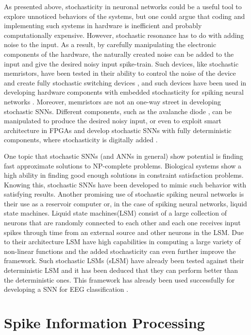 \documentclass[12pt]{report}
\begin{document}
As presented above, stochasticity in neuronal networks could be a useful tool to explore unnoticed behaviors of the systems, but one could argue that coding and implementing such systems in hardware is inefficient and probably computationally expensive. However, stochastic resonance has to do with adding noise to the input. As a result, by carefully manipulating the electronic components of the hardware, the naturally created noise can be added to the input and give the desired noisy input spike-train. Such devices, like stochastic memristors, have been tested in their ability to control the noise of the device and create fully stochastic switching devices \cite{Gaba2013}, and such devices have been used in developing hardware components with embedded stochasticity for spiking neural networks \cite{Maruan2015}. Moreover, memristors are not an one-way street in developing stochastic SNNs. Different components, such as the avalanche diode \cite{Clayton2011}, can be manipulated to produce the desired noisy input, or even to exploit smart architecture in FPGAs and develop stochastic SNNs with fully deterministic components, where stochasticity is digitally added \cite{Josep2012}. 

One topic that stochastic SNNs (and ANNs in general) show potential is finding fast approximate solutions to NP-complete problems. Biological systems show a high ability in finding good enough solutions in constraint satisfaction problems. Knowing this, stochastic SNNs have been developed to mimic such behavior with satisfying results\cite{Fonseca2017}. Another promising use of stochastic spiking neural networks is their use as a reservoir computer or, in the case of spiking neural networks, liquid state machines. Liquid state machines(LSM) consist of a large collection of neurons that are randomly connected to each other and each one receives input spikes through time from an external source and other neurons in the LSM. Due to their architecture LSM have high capabilities in computing a large variety of non-linear functions and the added stochasticity can even further improve the framework. Such stochastic LSMs (sLSM) have already been tested against their deterministic LSM \cite{IEEE2011} and it has been deduced that they can perform better than the deterministic ones. This framework has already been used successfully for developing a SNN for EEG classification \cite{Nuntalid2011}.

\bigskip
\section{Spike Information Processing}
\end{document}
